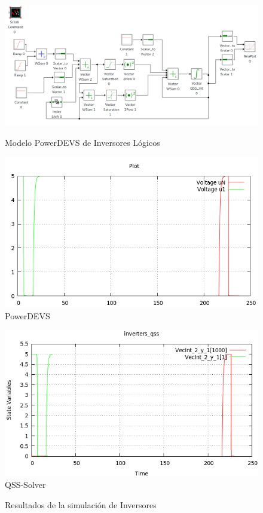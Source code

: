 \documentclass{beamer}
\begin{document}
\begin{frame}
\begin{figure}[H]
\includegraphics[width=0.75\linewidth]{inverters}
\label{model:inverters}
\caption{Modelo PowerDEVS de Inversores Lógicos}
\end{figure}
\end{frame}

\begin{frame}
\begin{figure}[H]
\begin{minipage}{0.5\textwidth}
 \includegraphics[width=\linewidth]{inversers-pd}
PowerDEVS
\end{minipage}\hfill
\begin{minipage}{0.5\textwidth}
 \includegraphics[width=\linewidth]{inversers-qss}
QSS-Solver
\end{minipage}
\caption{Resultados de la simulación de Inversores}\label{graph:inverters}
\end{figure}
\end{frame}
\end{document}
